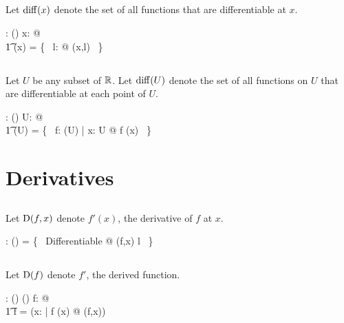 \documentclass{amsart}
\begin{document}
\subsection{}

Let $\operatorname{diff}(x)$ denote the set of all functions that are differentiable at $x$.

\begin{axdef}
	\diffR: \R \fun \power(\R \pfun \R)
\where
	\forall x: \R @ \\
	\t1	\diffR(x) = \bigcup \{~ l: \R @ \diffRR(x,l) ~\}
\end{axdef}

\subsection{}

Let $U$ be any subset of $\mathbb{R}$. 
Let $\operatorname{diff}(U)$ denote the set of all functions on $U$
that are differentiable at each point of $U$.

\begin{axdef}
	\diffPR: \power \R \fun \power(\R \pfun \R)
\where
	\forall U: \power \R @ \\
	\t1	\diffPR(U) = \{~ f: \CzeroPR(U) | \forall x: U @ f \in \diffR(x) ~\}
\end{axdef}

\section{Derivatives}

\subsection{}

Let $\operatorname{D}(f,x)$ denote $f'(x)$, the derivative of $f$ at $x$.

\begin{axdef}
	\derivFR: (\R \pfun \R) \cross \R \pfun \R
\where
	\derivFR = \{~ Differentiable @ (f,x) \mapsto l ~\}
\end{axdef}

\subsection{}

Let $\operatorname{D}(f)$ denote $f'$, the derived function.

\begin{axdef}
	\derivF: (\R \pfun \R) \fun (\R \pfun \R)
\where
	\forall f: \R \pfun \R @ \\
		\t1	\derivF f = (\lambda x: \R | f \in \diffR(x) @ \derivFR(f,x)) 
\end{axdef}
\end{document}
